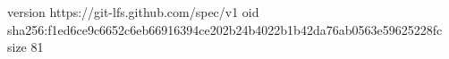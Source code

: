 version https://git-lfs.github.com/spec/v1
oid sha256:f1ed6ce9c6652c6eb66916394ce202b24b4022b1b42da76ab0563e59625228fc
size 81
